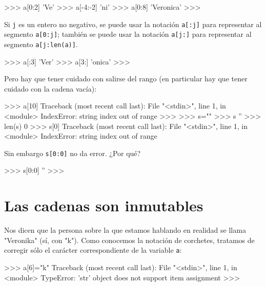 \begin{codigo-python-sn}
>>> a[0:2]
'Ve'
>>> a[-4:-2]
'ni'
>>> a[0:8]
'Veronica'
>>>
\end{codigo-python-sn}

Si \lstinline!j! es un entero no negativo, se puede usar la notación
\lstinline+a[:j]+ para representar al segmento \lstinline+a[0:j]+; también
se puede usar la notación \lstinline+a[j:]+ para representar al segmento
\lstinline+a[j:len(a)]+.

\begin{codigo-python-sn}
>>> a[:3]
'Ver'
>>> a[3:]
'onica'
>>>
\end{codigo-python-sn}

Pero hay que tener cuidado con salirse del rango (en particular hay que
tener cuidado con la cadena vacía):

\begin{codigo-python-sn}
>>> a[10]
Traceback (most recent call last):
  File "<stdin>", line 1, in <module>
IndexError: string index out of range
>>>
>>> s=""
>>> s
''
>>> len(s)
0
>>> s[0]
Traceback (most recent call last):
  File "<stdin>", line 1, in <module>
IndexError: string index out of range
\end{codigo-python-sn}

Sin embargo \lstinline+s[0:0]+ no da error. ¿Por qué?
\begin{codigo-python-sn}
>>> s[0:0]
''
>>>
\end{codigo-python-sn}



\section{Las cadenas son inmutables}

Nos dicen que la persona sobre la que estamos hablando en realidad se llama
"Veronika" (sí, con "k").  Como conocemos la notación de corchetes,
tratamos de corregir sólo el carácter correspondiente de la variable
\lstinline!a!:

\begin{codigo-python-sn}
>>> a[6]="k"
Traceback (most recent call last):
  File "<stdin>", line 1, in <module>
TypeError: 'str' object does not support item assignment
>>>
\end{codigo-python-sn}

